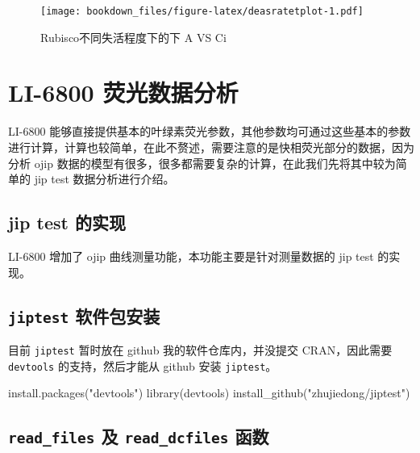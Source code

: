 \documentclass[
]{krantz}
\makeatletter
\newenvironment{Shaded}{\begin{snugshade}}{\end{snugshade}}
\newcommand{\FunctionTok}[1]{\textcolor[rgb]{0.00,0.00,0.00}{#1}}
\newcommand{\NormalTok}[1]{#1}
\newcommand{\StringTok}[1]{\textcolor[rgb]{0.31,0.60,0.02}{#1}}
\newenvironment{kframe}{%
\medskip{}
\setlength{\fboxsep}{.8em}
 \def\at@end@of@kframe{}%
 \ifinner\ifhmode%
  \def\at@end@of@kframe{\end{minipage}}%
  \begin{minipage}{\columnwidth}%
 \fi\fi%
 \def\FrameCommand##1{\hskip\@totalleftmargin \hskip-\fboxsep
 \colorbox{shadecolor}{##1}\hskip-\fboxsep
     \hskip-\linewidth \hskip-\@totalleftmargin \hskip\columnwidth}%
 \MakeFramed {\advance\hsize-\width
   \@totalleftmargin\z@ \linewidth\hsize
   \@setminipage}}%
 {\par\unskip\endMakeFramed%
 \at@end@of@kframe}
\renewenvironment{Shaded}{\begin{kframe}}{\end{kframe}}
\makeatother
\begin{document}
\begin{figure}
\centering
\texttt{[image: bookdown\_files/figure-latex/deasratetplot-1.pdf]}
\caption{\label{fig:deasratetplot}Rubisco不同失活程度下的下 A VS Ci}
\end{figure}

\cleardoublepage

\hypertarget{fluro68}{%
\section{LI-6800 荧光数据分析}\label{fluro68}}

LI-6800 能够直接提供基本的叶绿素荧光参数，其他参数均可通过这些基本的参数进行计算，计算也较简单，在此不赘述，需要注意的是快相荧光部分的数据，因为分析 ojip 数据的模型有很多，很多都需要复杂的计算，在此我们先将其中较为简单的 jip test 数据分析进行介绍。

\hypertarget{jiptest}{%
\subsection{jip test 的实现}\label{jiptest}}

LI-6800 增加了 ojip 曲线测量功能，本功能主要是针对测量数据的 jip test 的实现。

\hypertarget{jiptest_pack}{%
\subsection{\texorpdfstring{\texttt{jiptest} 软件包安装}{jiptest 软件包安装}}\label{jiptest_pack}}

目前 \texttt{jiptest} 暂时放在 github 我的软件仓库内，并没提交 CRAN，因此需要 \texttt{devtools} 的支持，然后才能从 github 安装 \texttt{jiptest}。

\begin{Shaded}
\begin{Highlighting}[]
\FunctionTok{install.packages}\NormalTok{(}\StringTok{"devtools"}\NormalTok{)}
\FunctionTok{library}\NormalTok{(devtools)}
\FunctionTok{install\_github}\NormalTok{(}\StringTok{"zhujiedong/jiptest"}\NormalTok{)}
\end{Highlighting}
\end{Shaded}

\hypertarget{readfluor}{%
\subsection{\texorpdfstring{\texttt{read\_files} 及 \texttt{read\_dcfiles} 函数}{read\_files 及 read\_dcfiles 函数}}\label{readfluor}}
\end{document}
